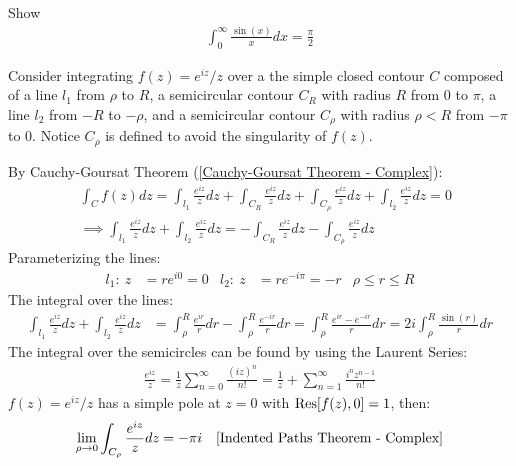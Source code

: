 \documentclass[12pt, english]{book}
\makeatletter
\renewenvironment{proof}[1][\proofname]{\par
	\pushQED{\qed}%
	\normalfont \topsep6\p@\@plus6\p@\relax
	\list{}{%
		\settowidth{\leftmargin}{\itshape\proofname:\hskip\labelsep}%
		\setlength{\labelwidth}{0pt}%
		\setlength{\itemindent}{-\leftmargin}%
	}%
	\item[\hskip\labelsep\itshape#1\@addpunct{:}]\ignorespaces
	}{ \popQED\endlist\@endpefalse}
\makeatother
\begin{document}
	\begin{example}
		\label{Dirichlet's Integral Example - Complex}
		Show 
		\begin{align*}
			\int_{0}^{\infty} \frac{\sin(x)}{x} dx = \frac{\pi}{2}
		\end{align*}
		\begin{proof}
			Consider integrating \(f(z) = e^{iz}/z\) over a the simple closed contour \(C\) composed of a line \(l_1\) from \(\rho\) to \(R\), a semicircular contour \(C_R\) with radius \(R\) from \(0\) to \(\pi\), a line \(l_2\) from \(-R\) to \(-\rho\), and a semicircular contour \(C_\rho\) with radius \(\rho < R\) from \(-\pi\) to \(0\). Notice \(C_\rho\) is defined to avoid the singularity of \(f(z)\).
			
			By Cauchy-Goursat Theorem (\cref{Cauchy-Goursat Theorem - Complex}):
			\begin{align*}
				&\int_{C} f(z) dz
				= \int_{l_1} \frac{e^{iz}}{z} dz + \int_{C_R} \frac{e^{iz}}{z} dz + \int_{C_\rho} \frac{e^{iz}}{z} dz + \int_{l_2} \frac{e^{iz}}{z} dz
				= 0 \\
				&\implies \int_{l_1} \frac{e^{iz}}{z} dz + \int_{l_2} \frac{e^{iz}}{z} dz = -\int_{C_R} \frac{e^{iz}}{z} dz - \int_{C_\rho} \frac{e^{iz}}{z} dz
			\end{align*}
			Parameterizing the lines:
			\begin{align*}
				l_1: \ z &= re^{i0} = 0	& 
				l_2: \ z &= re^{-i\pi} = -r & \rho \leq r \leq R
			\end{align*}
			The integral over the lines:
			\begin{align*}
				\int_{l_1} \frac{e^{iz}}{z} dz + \int_{l_2} \frac{e^{iz}}{z} dz
				&= \int_{\rho}^{R} \frac{e^{ir}}{r} dr - \int_{\rho}^{R} \frac{e^{-ir}}{r} dr
				 = \int_{\rho}^{R} \frac{e^{ir} - e^{-ir}}{r} dr = 2i \int_{\rho}^{R} \frac{\sin(r)}{r} dr
			\end{align*}
			The integral over the semicircles can be found by using the Laurent Series:
			\begin{align*}
				\frac{e^{iz}}{z} 
				= \frac{1}{z} \sum_{n=0}^{\infty} \frac{(iz)^n}{n!} 
				= \frac{1}{z} + \sum_{n=1}^{\infty} \frac{i^n z^{n-1}}{n!}
			\end{align*}
			\(f(z) = e^{iz}/z\) has a simple pole at \(z=0\) with \(\Res[f(z), 0] = 1\), then:
			\begin{align*}
				\lim_{\rho \rightarrow 0} \int_{C_\rho} \frac{e^{iz}}{z} dz &= -\pi i
					& \text{\Cref{Indented Paths Theorem - Complex}}

\end{align*}
\end{proof}
\end{example}
\end{document}
